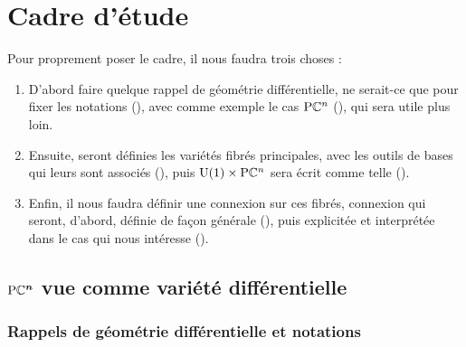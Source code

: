 \section{Cadre d'étude}\label{sec:cadre_geodiff}

Pour proprement poser le cadre, il nous faudra trois choses :
\begin{enumerate}
	
	\item D'abord faire quelque rappel de géométrie différentielle, ne serait-ce que pour fixer les notations (), avec comme exemple le cas $\text{\normalfont P}\mathbb{C}^{n}$ (), qui sera utile plus loin. 
	
	\item Ensuite, seront définies les variétés fibrés principales, avec les outils de bases qui leurs sont associés (), puis $\text{\normalfont U}(1)\times \text{\normalfont P}\mathbb{C}^{n}$ sera écrit comme telle ().
	
	\item Enfin, il nous faudra définir une connexion sur ces fibrés, connexion qui seront, d'abord, définie de façon générale (), puis explicitée et interprétée dans le cas qui nous intéresse ().
	
\end{enumerate}

\subsection{$\boldsymbol{\text{\normalfont P}\mathbb{C}^{n}}$ vue comme variété différentielle} \label{subsec:construc_PC^n}

\subsubsection{Rappels de géométrie différentielle et notations}\label{subsec:rappel2geo_diff}


